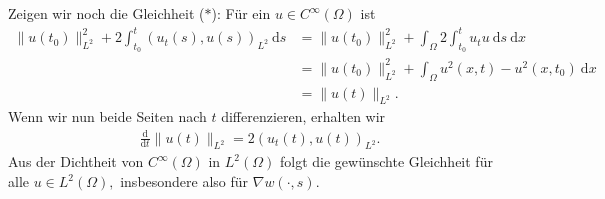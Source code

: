 \begin{solution}
Zeigen wir noch die Gleichheit ($\ast$): Für ein $u \in C^\infty(\Omega)$ ist
\begin{align*}
    \|u(t_0)\|^2_{L^2} + 2 \int_{t_0}^{t} (u_t(s), u(s))_{L^2} \mathrm{~d}s
    &= \|u(t_0)\|^2_{L^2} + \int_\Omega 2 \int_{t_0}^{t} u_t u \mathrm{~d}s \mathrm{~d}x\\
    &= \|u(t_0)\|^2_{L^2} + \int_\Omega u^2(x, t) - u^2(x, t_0) \mathrm{~d}x\\
    &= \| u(t)\|_{L^2}.
\end{align*}
Wenn wir nun beide Seiten nach $t$ differenzieren, erhalten wir
\begin{align*}
    \frac{\mathrm{d}}{\mathrm{d}t} \|u(t)\|_{L^2} = 2 \left(u_t(t), u(t)\right)_{L^2}.
\end{align*}
Aus der Dichtheit von $C^\infty(\Omega)$ in $L^2(\Omega)$ folgt die gewünschte Gleichheit für alle $u \in L^2(\Omega),$ insbesondere also für $\nabla w(\cdot, s).$
\end{solution}

